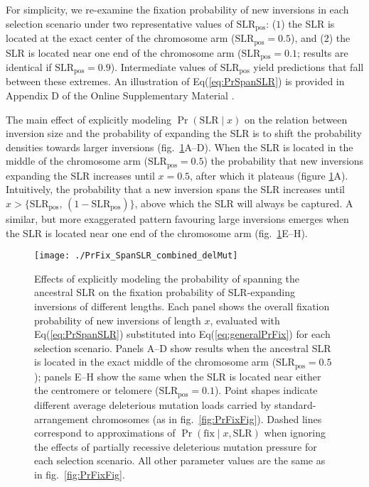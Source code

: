 \documentclass{article}[12pt]
\newcommand\hl[1]{%
  \bgroup
  \hskip0pt\color{blue!80!black}%
  #1%
  \egroup
}
\begin{document}
For simplicity, we re-examine the fixation probability of new inversions in each selection scenario under two representative values of $\text{SLR}_{\text{pos}}$: ($1$) the SLR is located at the exact center of the chromosome arm ($\text{SLR}_{\text{pos}} = 0.5$), and ($2$) the SLR is located near one end of the chromosome arm ($\text{SLR}_{\text{pos}} = 0.1$; results are identical if $\text{SLR}_{\text{pos}} = 0.9$). Intermediate values of $\text{SLR}_{\text{pos}}$ yield predictions that fall between these extremes. An illustration of Eq(\ref{eq:PrSpanSLR}) is provided in \hl{Appendix D of the Online Supplementary Material}.  

The main effect of explicitly modeling $\Pr(\text{SLR} \mid x)$ on the relation between inversion size and the probability of expanding the SLR is to shift the probability densities towards larger inversions (fig.~\ref{fig:PrSLRFixFig}A--D). When the SLR is located in the middle of the chromosome arm ($\text{SLR}_{\text{pos}} = 0.5$) the probability that new inversions expanding the SLR increases until $x = 0.5$, after which it plateaus (figure \ref{fig:PrSLRFixFig}A). Intuitively, the probability that a new inversion spans the SLR increases until $x > \{\text{SLR}_{\text{pos}},\,(1 - \text{SLR}_{\text{pos}})\}$, above which the SLR will always be captured. A similar, but more exaggerated pattern favouring large inversions emerges when the SLR is located near one end of the chromosome arm (fig.~\ref{fig:PrSLRFixFig}E--H).

 \begin{figure}[htbp]
 \centering
 \texttt{[image: ./PrFix\_SpanSLR\_combined\_delMut]}
 \caption{Effects of explicitly modeling the probability of spanning the ancestral SLR on the fixation probability of SLR-expanding inversions of different lengths. Each panel shows the overall fixation probability of new inversions of length $x$, evaluated with Eq(\ref{eq:PrSpanSLR}) substituted into Eq(\ref{eq:generalPrFix}) for each selection scenario. Panels A--D show results when the ancestral SLR is located in the exact middle of the chromosome arm ($\text{SLR}_\text{pos} = 0.5$); panels E--H show the same when the SLR is located near either the centromere or telomere ($\text{SLR}_\text{pos} = 0.1$). Point shapes indicate different average deleterious mutation loads carried by standard-arrangement chromosomes (as in fig.~\ref{fig:PrFixFig}). Dashed lines correspond to approximations of $\Pr(\text{fix} \mid x, \text{SLR})$ when ignoring the effects of partially recessive deleterious mutation pressure for each selection scenario. All other parameter values are the same as in fig.~\ref{fig:PrFixFig}.}
 \label{fig:PrSLRFixFig}
 \end{figure}
\end{document}
